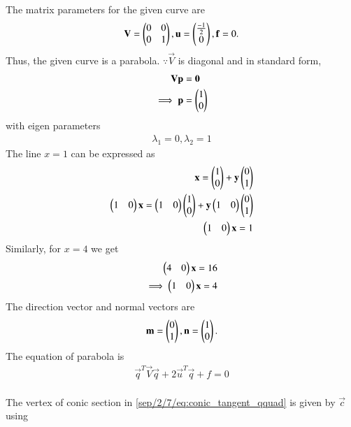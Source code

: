 

The matrix parameters  for the given curve are
\begin{align}
\mathbf{V} = \begin{pmatrix}0 & 0\\0 & 1\end{pmatrix}, \mathbf{u} = \begin{pmatrix}\frac{-1}{2}\\0\end{pmatrix}, \mathbf{f}=0.
\label{sep/2/7/eq:parab_twovar_params}
\end{align}
Thus, the given curve is a parabola.  $\because \vec{V}$ is diagonal and in standard form,
\begin{align}
\mathbf{V}\mathbf{p} &= \mathbf{0}
\\
\implies \mathbf{p} &= \begin{pmatrix}1\\0\end{pmatrix}
\label{sep/2/7/eq:parab_twovar_p}
\end{align}
with eigen parameters
\begin{align}
\lambda_1=0, \lambda_2=1
\end{align}
The line   $x=1$  can be expressed as
\begin{align}
\mathbf{x}=\begin{pmatrix}1\\0\end{pmatrix}+\mathbf{y}\begin{pmatrix}0\\1\end{pmatrix}\\
\begin{pmatrix}1 & 0\end{pmatrix}\mathbf{x}=\begin{pmatrix}1 & 0\end{pmatrix}\begin{pmatrix}1\\0\end{pmatrix}+\mathbf{y}\begin{pmatrix}1 & 0\end{pmatrix}\begin{pmatrix}0\\1\end{pmatrix}\\
\begin{pmatrix}1 & 0\end{pmatrix}\mathbf{x}=1\label{sep/2/7/eq:line1}
\end{align}
Similarly, for ${x}=4$ we get
\begin{align}\label{sep/2/7/eq:line2}
\begin{pmatrix}4 & 0\end{pmatrix}\mathbf{x}=16\\
\implies\begin{pmatrix}1 & 0\end{pmatrix}\mathbf{x}=4
\end{align}
The direction vector and normal vectors are
\begin{align}
\mathbf{m} = \begin{pmatrix}0\\1\end{pmatrix}, \mathbf{n} = \begin{pmatrix}1\\0\end{pmatrix}.
\label{sep/2/7/eq:parab_twovar_mn}
\end{align}
The equation of parabola is
\begin{align}
\vec{q}^T\vec{V}\vec{q} + 2\vec{u}^T\vec{q} +f = 0
\label{sep/2/7/eq:conic_tangent_qquad}
\end{align}\\
The vertex of conic section in \eqref{sep/2/7/eq:conic_tangent_qquad} is given by $\vec{c}$ using  
